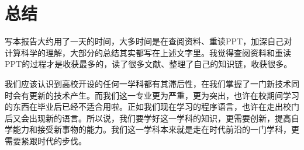 \documentclass{article}
\begin{document}


\section{总结}
写本报告大约用了一天的时间，大多时间是在查阅资料、重读PPT，加深自己对计算科学的理解，大部分的总结其实都写在上述文字里。我觉得查阅资料和重读PPT的过程才是收获最多的，读了很多文献、整理了自己的知识链，收获很多。\par
我们应该认识到高校开设的任何一学科都有其滞后性，在我们掌握了一门新技术同时会有更新的技术产生。而我们这一专业更为严重，更为突出，也许在校期间学习的东西在毕业后已经不适合用啦。正如我们现在学习的程序语言，也许在走出校门后又会出现新的语言。所以说，我们要学好这一学科的知识，更需要创新，提高自学能力和接受新事物的能力。我们这一学科本来就是走在时代前沿的一门学科，更需要紧跟时代的步伐。


\newpage
\end{document}
